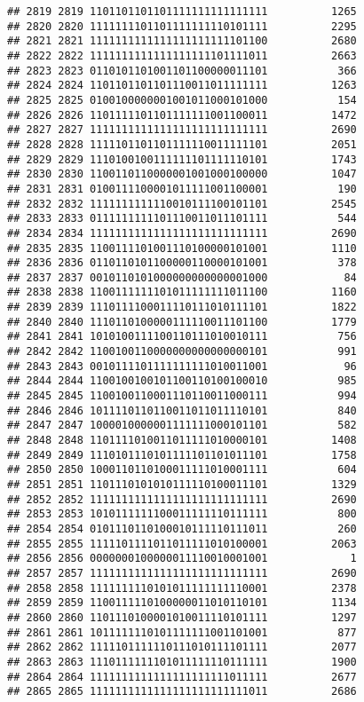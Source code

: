 \documentclass[]{article}
\begin{document}
\begin{verbatim}
## 2819 2819 1101101101101111111111111111          1265
## 2820 2820 1111111101101111111110101111          2295
## 2821 2821 1111111111111111111111101100          2680
## 2822 2822 1111111111111111111101111011          2663
## 2823 2823 0110101101001101100000011101           366
## 2824 2824 1101101101101110011011111111          1263
## 2825 2825 0100100000001001011000101000           154
## 2826 2826 1101111101101111111001100011          1472
## 2827 2827 1111111111111111111111111111          2690
## 2828 2828 1111101101101111110011111101          2051
## 2829 2829 1110100100111111101111110101          1743
## 2830 2830 1100110110000001001000100000          1047
## 2831 2831 0100111100001011111001100001           190
## 2832 2832 1111111111110010111100101101          2545
## 2833 2833 0111111111101110011011101111           544
## 2834 2834 1111111111111111111111111111          2690
## 2835 2835 1100111101001110100000101001          1110
## 2836 2836 0110110101100000110000101001           378
## 2837 2837 0010110101000000000000001000            84
## 2838 2838 1100111111101011111111011100          1160
## 2839 2839 1110111100011110111010111101          1822
## 2840 2840 1110110100000111110011101100          1779
## 2841 2841 1010100111100110111010010111           756
## 2842 2842 1100100110000000000000000101           991
## 2843 2843 0010111101111111111010011001            96
## 2844 2844 1100100100101100110100100010           985
## 2845 2845 1100100110001110110011000111           994
## 2846 2846 1011110110110011011011110101           840
## 2847 2847 1000010000001111111000101101           582
## 2848 2848 1101111010011011111010000101          1408
## 2849 2849 1110101110101111101101011101          1758
## 2850 2850 1000110110100011111010001111           604
## 2851 2851 1101110101010111110100011101          1329
## 2852 2852 1111111111111111111111111111          2690
## 2853 2853 1010111111100011111110111111           800
## 2854 2854 0101110110100010111110111011           260
## 2855 2855 1111101111011011111010100001          2063
## 2856 2856 0000000100000011110010001001             1
## 2857 2857 1111111111111111111111111111          2690
## 2858 2858 1111111110101011111111110001          2378
## 2859 2859 1100111110100000011010110101          1134
## 2860 2860 1101110100001010011110101111          1297
## 2861 2861 1011111110101111111001101001           877
## 2862 2862 1111101111110111010111101111          2077
## 2863 2863 1110111111101011111110111111          1900
## 2864 2864 1111111111111111111111011111          2677
## 2865 2865 1111111111111111111111111011          2686

\end{verbatim}
\end{document}
